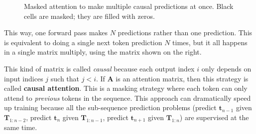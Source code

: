 \begin{figure}[h]
{\begin{minipage}{.49\linewidth}
\end{minipage}
}
\caption{Masked attention to make multiple causal predictions at once. Black cells are masked; they are filled with zeros.}
\label{fig:transformers:masked_attn_one_matmul}
\end{figure}

This way, one forward pass makes $N$ predictions rather than one prediction. This is equivalent to doing a single next token prediction $N$ times, but it all happens in a single matrix multiply, using the matrix shown on the right.

This kind of matrix is called \textit{causal} because each output index $i$ only depends on input indices $j$ such that $j < i$. If $\mathbf{A}$ is an attention matrix, then this strategy is called \textbf{causal attention}. This is a masking strategy where each token can only attend to \textit{previous} tokens in the sequence. This approach can dramatically speed up training because all the sub-sequence prediction problems (predict $\mathbf{t}_{n-1}$ given $\mathbf{T}_{1:n-2}$, predict $\mathbf{t}_{n}$ given $\mathbf{T}_{1:n-1}$, predict $\mathbf{t}_{n+1}$ given $\mathbf{T}_{1:n}$) are supervised at the same time.

